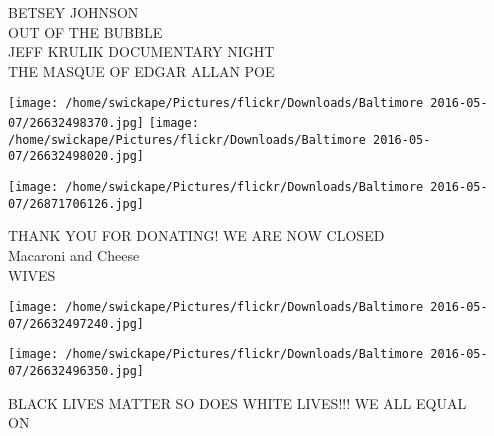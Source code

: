 \documentclass[10pt,letterpaper]{article}
\begin{document}
BETSEY JOHNSON\\
OUT OF THE BUBBLE\\
JEFF KRULIK DOCUMENTARY NIGHT\\
THE MASQUE OF EDGAR ALLAN POE
\pagebreak

\texttt{[image: /home/swickape/Pictures/flickr/Downloads/Baltimore 2016-05-07/26632498370.jpg]}
\texttt{[image: /home/swickape/Pictures/flickr/Downloads/Baltimore 2016-05-07/26632498020.jpg]}

\vspace{0.25in}
\texttt{[image: /home/swickape/Pictures/flickr/Downloads/Baltimore 2016-05-07/26871706126.jpg]}

THANK YOU FOR DONATING!  WE ARE NOW CLOSED\\
Macaroni and Cheese\\
WIVES
\pagebreak

\texttt{[image: /home/swickape/Pictures/flickr/Downloads/Baltimore 2016-05-07/26632497240.jpg]}

\vspace{0.25in}
\texttt{[image: /home/swickape/Pictures/flickr/Downloads/Baltimore 2016-05-07/26632496350.jpg]}

BLACK LIVES MATTER SO DOES WHITE LIVES!!! WE ALL EQUAL\\
ON
\pagebreak
\end{document}
